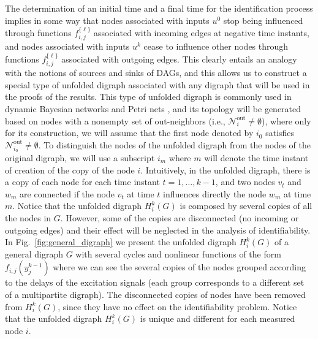 \documentclass[letterpaper,10pt,journal]{IEEEtran}
\newcommand{\NN}{\mathcal{N}}
\begin{document}
The determination of an initial time and a final time for the identification process implies in some way that nodes associated with inputs $u^0$ stop being influenced through functions $f_{i,j}^{\{ \ell \}}$ associated with incoming edges at negative time instants, and nodes associated with inputs $u^k$ cease to influence other nodes through functions $f_{i,j}^{\{ \ell \}}$ associated with outgoing edges. This clearly entails an analogy with the notions of sources and sinks of DAGs, and this allows us to construct a special type of unfolded digraph associated with any digraph that will be used in the proofs of the results. This type of unfolded digraph is commonly used in dynamic Bayesian networks \cite{murphy2002dynamic} and Petri nets \cite{mcmillan1993using}, and its topology will be generated based on nodes with a nonempty set of out-neighbors (i.e., $\NN_i^{\text{out}}\neq \emptyset$), where only for its construction, we will assume that the first node denoted by $i_0$ satisfies $\NN_{i_0}^{\text{out}}\neq\emptyset$. To distinguish the nodes of the unfolded digraph from the nodes of the original digraph, we will use a subscript $i_m$ where $m$ will denote the time instant of creation of the copy of the node $i$.
Intuitively, in the unfolded digraph, there is a copy of each node for each time instant $t=1,\ldots,k-1$, and two nodes $v_t$ and $w_m$ are connected if the node $v_t$ at time $t$ influences directly the node $w_m$ at time $m$.
Notice that the unfolded digraph $H_i^k(G)$ is composed by several copies of all the nodes in $G$. However, some of the copies are disconnected (no incoming or outgoing edges) and their effect will be neglected in the analysis of identifiability. In Fig.~\ref{fig:general_digraph} we present the unfolded digraph $H_i^k(G)$ of a general digraph $G$ with several cycles and nonlinear functions of the form $f_{i,j}(y_j^{k-1})$ where we can see the several copies of the nodes grouped according to the delays of the excitation signals (each group corresponds to a different set of a multipartite digraph). The disconnected copies of nodes have been removed from $H_i^k(G)$, since they have no effect on the identifiability problem. 
Notice that the unfolded digraph $H_i^k(G)$ is unique and different for each measured \linebreak node $i$. 
\end{document}
